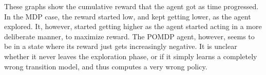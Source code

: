 \documentclass{pset}
\begin{document}
These graphs show the cumulative reward that the agent got as time progressed.
In the MDP case, the reward started low, and kept getting lower, as the agent
explored. It, however, started getting higher as the agent started acting in a
more deliberate manner, to maximize reward. The POMDP agent, however, seems to
be in a state where its reward just gets increasingly negative. It is unclear
whether it never leaves the exploration phase, or if it simply learns a completely
wrong transition model, and thus computes a very wrong policy.




\end{document}
